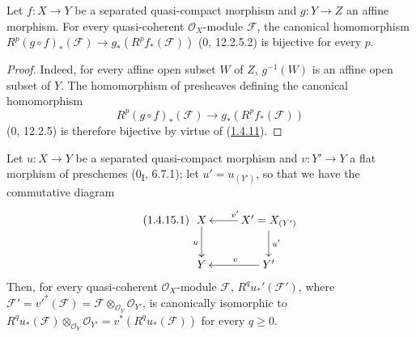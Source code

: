 \begin{proposition}[1.4.14]
\label{III.1.4.14}
Let $f:X\to Y$ be a separated quasi-compact morphism and $g:Y\to Z$ an
affine morphism. For every quasi-coherent $\mathcal O_X$-module
$\mathcal F$, the canonical homomorphism
$R^p(g\circ f)_*(\mathcal F)\to g_*(R^pf_*(\mathcal F))$ (0, 12.2.5.2) is
bijective for every $p$.
\end{proposition}

\begin{proof}
Indeed, for every affine open subset $W$ of $Z$, $g^{-1}(W)$ is an affine
open subset of $Y$. The homomorphism of presheaves defining the canonical
homomorphism
\[
R^p(g\circ f)_*(\mathcal F)\longrightarrow g_*(R^pf_*(\mathcal F))
\]
(0, 12.2.5) is therefore bijective by virtue of
(\hyperref[III.1.4.11]{1.4.11}).
\end{proof}

\begin{proposition}[1.4.15]
\label{III.1.4.15}
Let $u:X\to Y$ be a separated quasi-compact morphism and $v:Y'\to Y$ a
flat morphism of preschemes (0\textsubscript{I}, 6.7.1); let
$u'=u_{(Y')}$, so that we have the commutative diagram
\begin{equation}
\label{III.1.4.15.1}
\tag{1.4.15.1}
\xymatrix{
X\ar[d]_u & X'=X_{(Y')}\ar[l]_{v'}\ar[d]^{u'}\\
Y & Y'\ar[l]_v
}
\end{equation}
Then, for every quasi-coherent $\mathcal O_X$-module $\mathcal F$,
$R^qu_*'(\mathcal F')$, where
$\mathcal F'=v'^*(\mathcal F)=\mathcal F\otimes_{\mathcal O_Y}\mathcal O_{Y'}$,
is canonically isomorphic to
$R^qu_*(\mathcal F)\otimes_{\mathcal O_Y}\mathcal O_{Y'}
=v^*(R^qu_*(\mathcal F))$ for every $q\geq0$.
\end{proposition}

